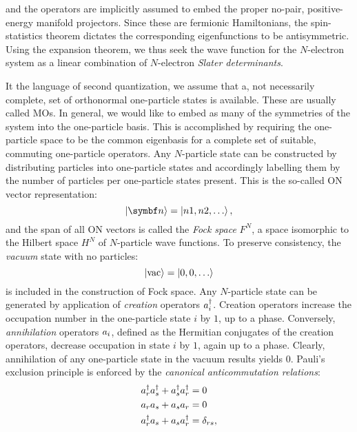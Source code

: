 and the operators are implicitly assumed to embed the proper no-pair,
positive-energy manifold projectors.\autocite{Sucher1980-vf}
Since these are fermionic Hamiltonians, the spin-statistics theorem
dictates the corresponding eigenfunctions to be
antisymmetric.
Using the expansion theorem,\autocite{Gross1991-hi} we thus seek the wave
function for the $N$-electron system as a linear combination of
$N$-electron \emph{Slater determinants}.

It the language of second quantization, we assume that a, not
necessarily complete, set of orthonormal one-particle states is
available. These are usually called \glspl{MO}.
In general, we would like to embed as many of the symmetries of the
system into the one-particle basis. This is accomplished by requiring
the one-particle space to be the common eigenbasis for a complete set of
suitable, commuting one-particle operators.\autocite{Gross1991-hi}
Any $N$-particle state can be constructed by distributing particles
into one-particle states and accordingly labelling them by the number of
particles per one-particle states present.
This is the so-called \gls{ON} vector representation:
\begin{equation}
  \ket{\vect{n}} = \ket{n1,n2,\ldots},
\end{equation}
and the span of all \acrshort{ON} vectors is called the \emph{Fock
space} $F^N$, a space isomorphic to the Hilbert space $H^N$ of
$N$-particle wave functions.
To preserve consistency, the \emph{vacuum} state with no particles:
\begin{equation}
 \ket{\mathrm{vac}} = \ket{0,0,\ldots}
\end{equation}
is included in the construction of Fock space.
Any $N$-particle state can be generated by application of
\emph{creation} operators $a_{i}^{\dagger}$. Creation operators increase the
occupation number in the one-particle state $i$ by $1$, up to a phase.
Conversely, \emph{annihilation} operators $a_{i}$, defined as the Hermitian
conjugates of the creation operators, decrease occupation in state $i$
by $1$, again up to a phase. Clearly, annihilation of any one-particle
state in the vacuum results yields $0$.
Pauli's exclusion principle is enforced by the \emph{canonical
anticommutation relations}:
\begin{subequations}
  \begin{align}
    a_{r}^{\dagger}a_{s}^{\dagger} + a_{s}^{\dagger}a_{r}^{\dagger} &= 0 \\
    a_{r}a_{s} + a_{s}a_{r} &= 0 \\
    a_{r}^{\dagger}a_{s} + a_{s}a_{r}^{\dagger} &= \delta_{rs},
  \end{align}
\end{subequations}
